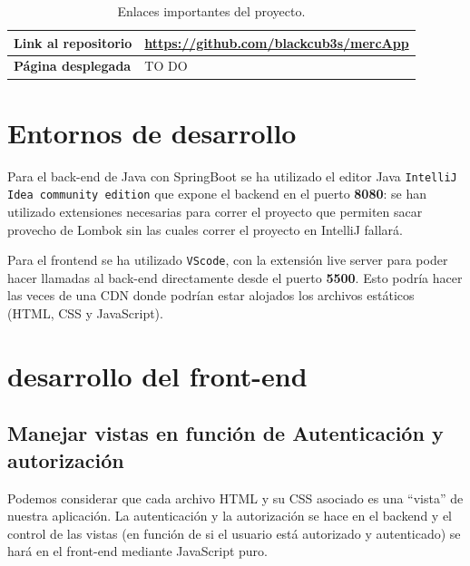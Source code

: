 \documentclass[a4paper,12pt]{report}
\begin{document}
			
			
			
			
			
			
			
			
			\begin{table}[h!]
				\centering
				\begin{tabular}{|p{3.8cm}|p{11cm}|}
					\hline
					\textbf{Link al repositorio} & \href{https://github.com/blackcub3s/mercApp}{https://github.com/blackcub3s/mercApp} \\
					\hline
					\textbf{Página desplegada} & TO DO \\ %
					\hline
				\end{tabular}
				\caption{Enlaces importantes del proyecto.}
				\label{tabla:enlaces}
			\end{table}

	
	
		
			\section{Entornos de desarrollo}
			
				Para el back-end de Java con SpringBoot se ha utilizado el editor Java \texttt{IntelliJ Idea community edition} que expone el backend en el puerto\textbf{ 8080}: se han utilizado extensiones necesarias para correr el proyecto que permiten sacar provecho de Lombok sin las cuales correr el proyecto en IntelliJ fallará.
				
				Para el frontend se ha utilizado \texttt{VScode}, con la extensión live server para poder hacer llamadas al back-end directamente desde el puerto \textbf{5500}. Esto podría hacer las veces de una CDN donde podrían estar alojados los archivos estáticos (HTML, CSS y JavaScript).
		
	
		
			\section{desarrollo del front-end}
		
			\subsection{Manejar vistas en función de Autenticación y autorización}
			
			
			Podemos considerar que cada archivo HTML y su CSS asociado es una ``vista'' de nuestra aplicación.  La autenticación y la autorización se hace en el backend y el control de las vistas (en función de si el usuario está autorizado y autenticado) se hará en el front-end mediante JavaScript puro.
			
\end{document}
